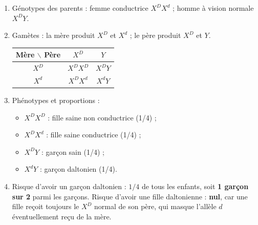 \documentclass[11pt]{article}
\begin{document}
\begin{corrige}
\begin{enumerate}
\item Génotypes des parents : femme conductrice $X^{D}X^{d}$ ; homme à vision normale $X^{D}Y$.
\item Gamètes : la mère produit $X^{D}$ et $X^{d}$ ; le père produit $X^{D}$ et $Y$.
\begin{center}
\begin{tabular}{|c|c|c|}
\hline
\rowcolor{popblueL} Mère $\backslash$ Père & $X^{D}$ & $Y$ \\
\hline
$X^{D}$ & $X^{D}X^{D}$ & $X^{D}Y$ \\
\hline
$X^{d}$ & $X^{D}X^{d}$ & $X^{d}Y$ \\
\hline
\end{tabular}
\end{center}
\item Phénotypes et proportions :
\begin{itemize}
\item $X^{D}X^{D}$ : fille saine non conductrice (1/4) ;
\item $X^{D}X^{d}$ : fille saine conductrice (1/4) ;
\item $X^{D}Y$ : garçon sain (1/4) ;
\item $X^{d}Y$ : garçon daltonien (1/4).
\end{itemize}
\item Risque d'avoir un garçon daltonien : $1/4$ de tous les enfants, soit \textbf{1 garçon sur 2} parmi les garçons. Risque d'avoir une fille daltonienne : \textbf{nul}, car une fille reçoit toujours le $X^{D}$ normal de son père, qui masque l'allèle $d$ éventuellement reçu de la mère.
\end{enumerate}
\end{corrige}
\end{document}
